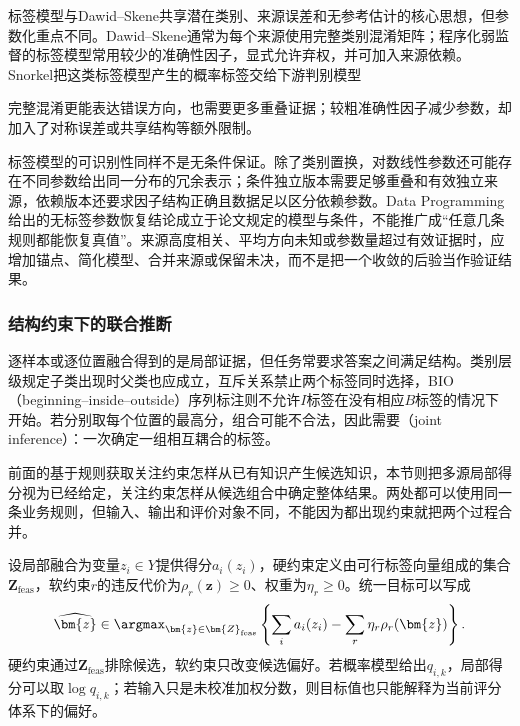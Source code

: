\Needspace{70mm}
标签模型与Dawid--Skene共享潜在类别、来源误差和无参考估计的核心思想，但参数化重点不同。Dawid--Skene通常为每个来源使用完整类别混淆矩阵；程序化弱监督的标签模型常用较少的准确性因子，显式允许弃权，并可加入来源依赖。Snorkel把这类标签模型产生的概率标签交给下游判别模型

完整混淆更能表达错误方向，也需要更多重叠证据；较粗准确性因子减少参数，却加入了对称误差或共享结构等额外限制。

标签模型的可识别性同样不是无条件保证。除了类别置换，对数线性参数还可能存在不同参数给出同一分布的冗余表示；条件独立版本需要足够重叠和有效独立来源，依赖版本还要求因子结构正确且数据足以区分依赖参数。Data Programming给出的无标签参数恢复结论成立于论文规定的模型与条件，不能推广成“任意几条规则都能恢复真值”。来源高度相关、平均方向未知或参数量超过有效证据时，应增加锚点、简化模型、合并来源或保留未决，而不是把一个收敛的后验当作验证结果。

\subsubsection{结构约束下的联合推断}
\label{sec:knowledge-fusion-structured-inference}

逐样本或逐位置融合得到的是局部证据，但任务常要求答案之间满足结构。类别层级规定子类出现时父类也应成立，互斥关系禁止两个标签同时选择，BIO（beginning--inside--outside）序列标注则不允许$I$标签在没有相应$B$标签的情况下开始。若分别取每个位置的最高分，组合可能不合法，因此需要（joint inference）：一次确定一组相互耦合的标签。

前面的基于规则获取关注约束怎样从已有知识产生候选知识，本节则把多源局部得分视为已经给定，关注约束怎样从候选组合中确定整体结果。两处都可以使用同一条业务规则，但输入、输出和评价对象不同，不能因为都出现约束就把两个过程合并。

设局部融合为变量$z_i\in Y$提供得分$a_i(z_i)$，硬约束定义由可行标签向量组成的集合$\bm{Z}_{\mathrm{feas}}$，软约束$r$的违反代价为$\rho_r(\bm{z})\geq0$、权重为$\eta_r\geq0$。统一目标可以写成
\begin{equation}
  \widehat{\bm{z}}
  \in\argmax_{\bm{z}\in\bm{Z}_{\mathrm{feas}}}
  \left\{
    \sum_i a_i(z_i)
    -\sum_r\eta_r\rho_r(\bm{z})
  \right\}.
  \label{eq:knowledge-fusion-structured-objective}
\end{equation}
硬约束通过$\bm{Z}_{\mathrm{feas}}$排除候选，软约束只改变候选偏好。若概率模型给出$q_{i,k}$，局部得分可以取$\log q_{i,k}$；若输入只是未校准加权分数，则目标值也只能解释为当前评分体系下的偏好。

